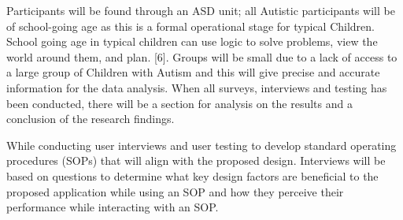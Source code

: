 Participants will be found through an ASD unit; all Autistic participants will be of school-going age as this is a formal operational stage for typical Children. School going age in typical children can use logic to solve problems, view the world around them, and plan. [6]. Groups will be small due to a lack of access to a large group of Children with Autism and this will give precise and accurate information for the data analysis. When all surveys, interviews and testing has been conducted, there will be a section for analysis on the results and a conclusion of the research findings. 

While conducting user interviews and user testing to develop standard operating procedures (SOPs) that will align with the proposed design.  Interviews will be based on questions to determine what key  design  factors are beneficial to the proposed application while  using  an  SOP  and  how  they  perceive their performance  while interacting with an SOP.